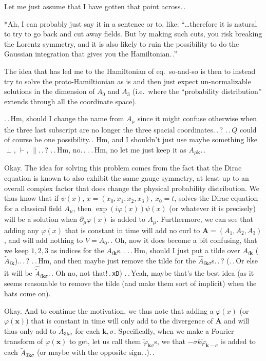 \documentclass{report}
\begin{document}
Let me just assume that I have gotten that point across.\,.

*Ah, I can probably just say it in a sentence or to, like: ``\ldots therefore it is natural to try to go back and cut away fields. But by making such cuts, you risk breaking the Lorentz symmetry, and it is also likely to ruin the possibility to do the Gaussian integration that gives you the Hamiltonian.\,.''

The idea that has led me to the Hamiltonian of eq.\ so-and-so is then to instead try to solve the proto-Hamiltionian as is and then just expect un-normalizable solutions in the dimension of $A_0$ and $A_3$ (i.e.\ where the ``probability distribution'' extends through all the coordinate space). 

.\,.\,Hm, should I change the name from $A_\mu$ since it might confuse otherwise when the three last subscript are no longer the three spacial coordinates.\,.\,? .\,.\,$Q$ could of course be one possibility.\,. Hm, and I shouldn't just use maybe something like $\perp$, $\vdash$, $\parallel$.\,.\,? .\,.\,Hm, no.\,. .\,.\,Hm, no let me just keep it as $A_{\mu \boldsymbol{k}}$.\,. 

Okay. The idea for solving this problem comes from the fact that the Dirac equation is known to also exhibit the same gauge symmetry, at least up to an overall complex factor that does change the physical probability distribution. We thus know that if $\psi(x)$, $x=(x_0, x_1, x_2, x_3)$, $x_0 = t$, solves the Dirac equation for a classical field $A_\mu$, then $\exp(i\varphi(x))\psi(x)$ (or whatever it is precisely) will be a solution when $\partial_\mu \varphi(x)$ is added to $A_\mu$. Furthermore, we can see that adding any $\varphi(x)$ that is constant in time will add no curl to $\boldsymbol{A}=(A_1, A_2, A_3)$, and will add nothing to $V = A_0$.\,. Oh, now it does become a bit confusing, that we keep ${1,2,3}$ as indices for the $A_{i\boldsymbol{k}}$s.\,. .\,.\,Hm, should I just put a tilde over $A_{i\boldsymbol{k}}$ ($\tilde A_{i\boldsymbol{k}}$)..\,.\,? .\,.\,Hm, and then maybe just remove the tilde for the $\hat{A}_{i \boldsymbol k \sigma}$s.\,.\,? (.\,.\,Or else it will be $\hat{\tilde A}_{i \boldsymbol k \sigma}$.\,. Oh no, not that!\,.\,\texttt{xD}) .\,.\,Yeah, maybe that's the best idea (as it seems reasonable to remove the tilde (and make them sort of implicit) when the hats come on).

Okay. And to continue the motivation, we thus note that adding a $\varphi(x)$ (or $\varphi(\boldsymbol{x})$) that is constant in time will only add to the divergence of $\boldsymbol{A}$ and will thus only add to $\tilde A_{3\boldsymbol{k}\sigma}$ for each $\boldsymbol{k}, \sigma$. Specifically, when we make a Fourier transform of $\varphi(\boldsymbol{x})$ to get, let us call them $\tilde\varphi_{\boldsymbol{k}\sigma}$s, we that $-\sigma k\tilde\varphi_{\boldsymbol{k}-\sigma}$ is added to each $\tilde A_{3\boldsymbol{k}\sigma}$ (or maybe with the opposite sign.\,.).\,.
\end{document}
